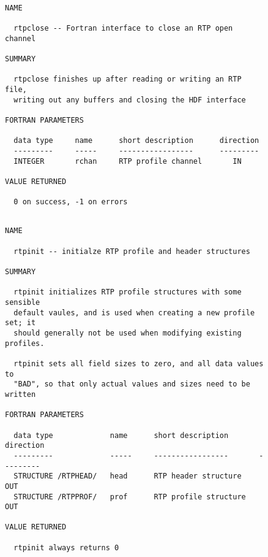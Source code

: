 \documentclass[12pt]{article}
\begin{document}
\begin{figure}
{\small
\begin{verbatim}

NAME    

  rtpclose -- Fortran interface to close an RTP open channel

SUMMARY

  rtpclose finishes up after reading or writing an RTP file, 
  writing out any buffers and closing the HDF interface

FORTRAN PARAMETERS

  data type     name      short description      direction
  ---------     -----     -----------------      ---------
  INTEGER       rchan     RTP profile channel       IN

VALUE RETURNED

  0 on success, -1 on errors

\end{verbatim}
}
\end{figure}
\begin{figure}
{\small
\begin{verbatim}

NAME    

  rtpinit -- initialze RTP profile and header structures

SUMMARY

  rtpinit initializes RTP profile structures with some sensible
  default vaules, and is used when creating a new profile set; it
  should generally not be used when modifying existing profiles.

  rtpinit sets all field sizes to zero, and all data values to
  "BAD", so that only actual values and sizes need to be written

FORTRAN PARAMETERS

  data type             name      short description       direction
  ---------             -----     -----------------       ---------
  STRUCTURE /RTPHEAD/   head      RTP header structure       OUT
  STRUCTURE /RTPPROF/   prof      RTP profile structure      OUT

VALUE RETURNED

  rtpinit always returns 0

\end{verbatim}
}
\end{figure}
\end{document}
